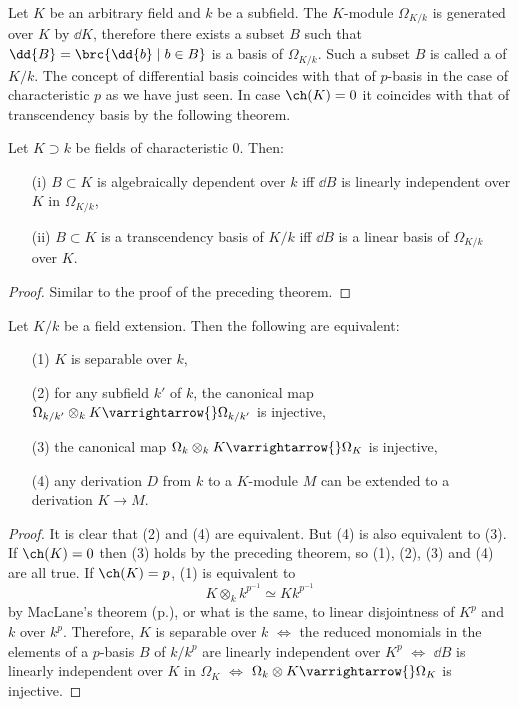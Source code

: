 \documentclass[../main]{subfiles}
\begin{document}
\newparagraph
Let $K$ be an arbitrary field and $k$ be a subfield. The $K$-module $\Omega_{K/k}$ is generated over $K$ by $\dd{K}$, therefore there exists a subset $B$ such that \newline $\dd{B} = \brc{\dd{b} \mid b \in B}$ is a basis of $\Omega_{K/k}$. Such a subset $B$ is called a  of $K/k$. The concept of differential basis coincides with that of $p$-basis in the case of characteristic $p$ as we have just seen. In case $\ch(K) = 0$ it coincides with that of transcendency
basis by the following theorem. 
\begin{theorem}
\label{thm:087}
    Let $K\supset k$ be fields of characteristic 0. Then:
    \begin{enumerate}
    \item[(i)] $B\subset K$ is algebraically dependent over $k$ iff $\dd{B}$ is linearly independent over $K$ in $\Omega_{K/k}$,
    \item[(ii)] $B\subset K$ is a transcendency basis of $K/k$ iff $\dd{B}$ is a linear basis of $\Omega_{K/k}$ over $K$.
\end{enumerate}
\end{theorem}
\begin{proof}
    Similar to the proof of the preceding theorem.
\end{proof}
\begin{partheorem}
\label{thm:088}
    Let $K/k$ be a field extension. Then the following are equivalent:
    \begin{enumerate}
    \item[(1)] $K$ is separable over $k$,
    \item[(2)] for any subfield $k'$ of $k$, the canonical map $\Omega_{k/k'}\otimes_k K\varrightarrow{} \Omega_{k/k'}$ is injective,
    \item[(3)] the canonical map $\Omega_k \otimes_k K \varrightarrow{} \Omega_K$ is injective,
    \item[(4)] any derivation $D$ from $k$ to a $K$-module $M$ can be extended to a derivation $K \longrightarrow M$. 
    \end{enumerate}
\end{partheorem}
\begin{proof}
    It is clear that (2) and (4) are equivalent. But (4) is also equivalent to (3). If $\ch(K) = 0$ then (3) holds by the preceding theorem, so (1), (2), (3) and (4) are all true. If $\ch(K) = p$, (1) is equivalent to \[ K\otimes_k k^{p^{-1}}\simeq Kk^{p^{-1}}\] by MacLane's theorem (p.\pageref{exe:27.01}), or what is the same, to linear disjointness of $K^p$ and $k$ over $k^p$. Therefore, $K$ is separable over $k$ $\iff$ the reduced monomials in the elements of a $p$-basis $B$ of $k/k^p$ are linearly independent over $K^p$ $\iff$ $\dd{B}$ is linearly independent over $K$ in $\Omega_K$ $\iff$ $\Omega_k\otimes K \varrightarrow{} \Omega_K$ is injective. 
\end{proof}
\end{document}
